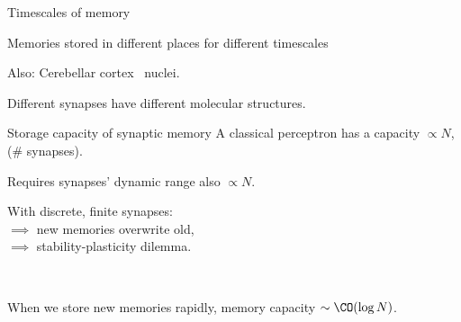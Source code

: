 \documentclass{beamer}%
\begin{document}
\begin{frame}{Timescales of memory}
%
 \parbox[t]{0.47\linewidth}{
 Memories stored in different places for different timescales


 \begin{center}
 \end{center}

 Also: Cerebellar cortex \lto\ nuclei.


 }
 \hspace{0.03\linewidth}
 \parbox[t]{0.47\linewidth}{
 Different synapses have different molecular structures.
 \begin{center}
 \end{center}
 }
%
\end{frame}


\begin{frame}{Storage capacity of synaptic memory}
%
  A classical perceptron has a capacity $\propto N$, (\# synapses).

\vp\parbox[t]{0.59\linewidth}{%
  Requires synapses' dynamic range also $\propto N$.

 \vp With discrete, finite synapses:\\
 \hp $\implies$ new memories overwrite old,\\
 \hp $\implies$ stability-plasticity dilemma.
 }
 \parbox[t]{0.4\linewidth}{
    \hfill{}
 }
 \\

 \vp When we store new memories rapidly, memory capacity  $\sim\CO(\log N)$.
 \\ 
%
\end{frame}


\end{document}
